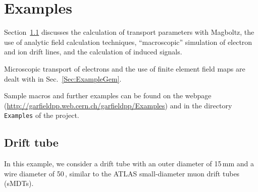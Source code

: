 \section{Examples}

Section~\ref{Sec:ExampleTube} discusses the 
calculation of transport parameters with Magboltz, 
the use of analytic field calculation techniques, 
``macroscopic'' simulation of electron and ion drift lines, 
and the calculation of induced signals. 
 
Microscopic transport of electrons and 
the use of finite element field maps are dealt with in 
Sec.~\ref{Sec:ExampleGem}. 

Sample macros and further examples can be found on the webpage 
(\url{http://garfieldpp.web.cern.ch/garfieldpp/Examples}) and 
in the directory \texttt{Examples} of the project.
 
\subsection{Drift tube}\label{Sec:ExampleTube}
In this example, we consider a drift tube with an outer diameter of 
15\,mm and a wire diameter of 50\,, similar to the 
ATLAS small-diameter muon drift tubes (sMDTs).

